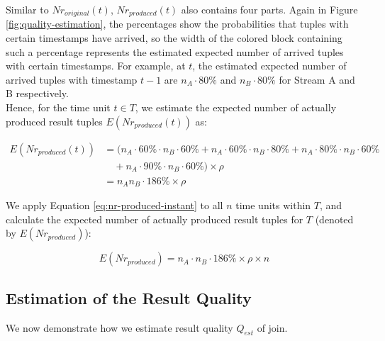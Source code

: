 \documentclass[a4paper, 11pt, twoside]{report}
\begin{document}
Similar to $Nr_{original}(t)$, $Nr_{produced}(t)$ also contains four parts. Again in Figure \ref{fig:quality-estimation}, the percentages show the probabilities that tuples with certain timestamps have arrived, so the width of the colored block containing such a percentage represents the estimated expected number of arrived tuples with certain timestamps. For example, at $t$, the estimated expected number of arrived tuples with timestamp $t-1$ are $n_{A} \cdot 80\%$ and $n_{B} \cdot 80\%$ for Stream A and B respectively.\\

Hence, for the time unit $t\in T$, we estimate the expected number of actually produced result tuples $E(Nr_{produced}(t))$ as:

\begin{small}
\begin{equation}
\label{eq:nr-produced-instant}
\begin{split}
E(Nr_{produced}(t))	&=(n_{A} \cdot 60\% \cdot n_{B} \cdot 60\% + n_{A} \cdot 60\% \cdot n_{B} \cdot 80\% + n_{A} \cdot 80\% \cdot n_{B} \cdot 60\% \\
&\quad + n_{A} \cdot 90\% \cdot n_{B} \cdot 60\%)\times \rho	\\
 				&=n_{A} n_{B} \cdot 186\% \times \rho
\end{split}
\end{equation}
\end{small}

%

We apply Equation \ref{eq:nr-produced-instant} to all $n$ time units within $T$, and calculate the expected number of actually produced result tuples for $T$ (denoted by $E(Nr_{produced})$):

\begin{equation}
\label{eq:nr-produced}
E(Nr_{produced}) = n_{A}\cdot n_{B} \cdot 186\% \times \rho \times n
\end{equation}

\subsection{Estimation of the Result Quality}
\label{subsec:estimation-of-quality}

We now demonstrate how we estimate result quality $Q_{est}$ of join.\\

%
\end{document}

